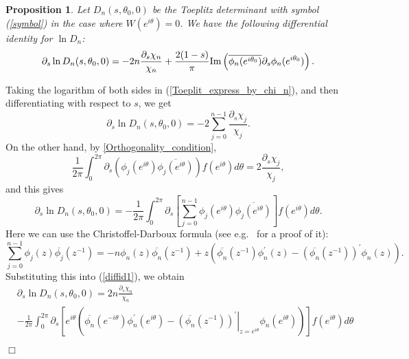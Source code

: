 \documentclass[11pt,fleqn]{article}
\numberwithin{equation}{section}
\newtheorem{proposition}[theorem]{Proposition}
\newenvironment{proof}%
    {\rm \trivlist \item[\hskip \labelsep{\bf Proof. }]}%
    {\hspace*{\fill}$\Box$\endtrivlist}
\begin{document}
\begin{proposition}
\label{proposition: diff id}
Let $D_n(s,\theta_0,0)$ be the Toeplitz determinant with symbol (\ref{symbol}) in the case where $W(e^{i\theta})= 0$.
We have the following differential identity for $\ln D_{n}$:
\begin{equation}\label{Differential_identity_for_D_n}
\partial_{s} \ln D_n(s,\theta_{0},0) = -2n \frac{\partial_{s} \chi_n}{\chi_n} + \frac{2(1-s)}{\pi} \mbox{\rm Im}\left( \overline{\phi_{n}(e^{i\theta_{0}})} \partial_{s}\phi_{n}(e^{i\theta_{0}}) \right).
\end{equation}
\end{proposition}
\begin{proof}
Taking the logarithm of both sides in (\ref{Toeplit_express_by_chi_n}), and then differentiating with respect to $s$, we get
\begin{equation*}
\partial_{s} \ln D_n(s,\theta_{0},0) = -2 \sum_{j=0}^{n-1} \frac{\partial_{s}\chi_{j}}{\chi_{j}}.
\end{equation*}
On the other hand, by \eqref{Orthogonality_condition},
\begin{equation*}
\frac{1}{2\pi} \int_{0}^{2\pi} \partial_{s} \left( \phi_{j}(e^{i\theta}) \overline{\phi_{j}(e^{i\theta})} \right) f(e^{i\theta})d\theta = 2\frac{\partial_{s}\chi_{j}}{\chi_{j}},
\end{equation*}
and this gives
\begin{equation}\label{diffid1}
\partial_{s} \ln D_n(s,\theta_{0},0) = - \frac{1}{2\pi} \int_{0}^{2\pi} \partial_{s} \left[ \sum_{j=0}^{n-1} \phi_{j}(e^{i\theta}) \overline{\phi_{j}(e^{i\theta})} \right] f(e^{i\theta})d\theta.
\end{equation}
Here we can use the Christoffel-Darboux formula (see e.g.\ \cite{Simon, Deift2} for a proof of it):
\begin{equation*}
\sum_{j=0}^{n-1} \phi_{j}(z) \overline{\phi_{j}}(z^{-1}) = -n\phi_{n}(z) \overline{\phi_{n}}(z^{-1}) + z\left( \overline{\phi_{n}} (z^{-1}) \phi_{n}^{\prime}(z) - \left( \overline{\phi_{n}}(z^{-1}) \right)^{\prime} \phi_{n}(z) \right).
\end{equation*}
Substituting this into (\ref{diffid1}), we obtain
\begin{align} 
&\partial_{s}\ln D_{n}(s,\theta_{0},0)  =  2n \frac{\partial_{s} \chi_{n}}{\chi_{n}}\nonumber \\ &- \frac{1}{2\pi} \int_{0}^{2\pi} \partial_{s} \left[ e^{i\theta}\left( \overline{\phi_{n}} (e^{-i\theta}) \phi_{n}^{\prime}(e^{i\theta}) - \left. \left( \overline{\phi_{n}}(z^{-1}) \right)^{\prime}\right|_{z=e^{i\theta}} \phi_{n}(e^{i\theta}) \right) \right] f(e^{i\theta})d\theta \nonumber\\

\end{align}
\end{proof}
\end{document}
